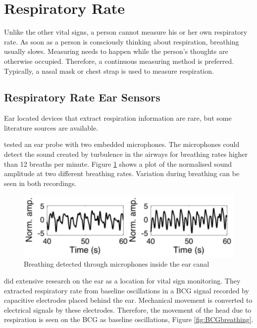 \section{Respiratory Rate}
Unlike the other vital signs, a person cannot measure his or her own respiratory rate. As soon as a person is consciously thinking about respiration, breathing usually slows. Measuring needs to happen while the person's thoughts are otherwise occupied. Therefore, a continuous measuring method is preferred. Typically, a nasal mask or chest strap is used to measure respiration. 

\subsection{Respiratory Rate Ear Sensors}
Ear located devices that extract respiration information are rare, but some literature sources are available.

\medskip
\cite{goverdovsky2016hearables} tested an ear probe with two embedded microphones. The microphones could detect the sound created by turbulence in the airways for breathing rates higher than 12 breaths per minute. Figure \ref{fig:BreathingSound} shows a plot of the normalised sound amplitude at two different breathing rates. Variation during breathing can be seen in both recordings.

\begin{figure}[h]
   \centering
   \includegraphics[scale=0.8]{figs/BreathingSound}
   \caption{Breathing detected through microphones inside the ear canal \citep{goverdovsky2016hearables}}
   \label{fig:BreathingSound}
\end{figure}

\cite{da2010ear} did extensive research on the ear as a location for vital sign monitoring. They extracted respiratory rate from baseline oscillations in a BCG signal recorded by capacitive electrodes placed behind the ear. Mechanical movement is converted to electrical signals by these electrodes. Therefore, the movement of the head due to respiration is seen on the BCG as baseline oscillations, Figure \ref{fig:BCGbreathing}.

